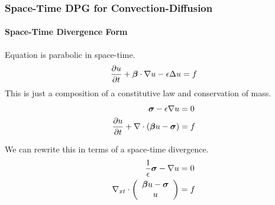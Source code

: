 \documentclass[18pt,xcolor=table]{beamer}
\begin{document}
\begin{frame}[t]
\frametitle{Space-Time DPG for Convection-Diffusion}
\framesubtitle{Space-Time Divergence Form}
Equation is parabolic in space-time.
\[
\frac{\partial u}{\partial t}+\boldsymbol\beta\cdot\nabla u-\epsilon\Delta u=f
\]
This is just a composition of a constitutive law and conservation of mass.
\begin{align*}
\boldsymbol\sigma-\epsilon\nabla u&=0\\
\frac{\partial u}{\partial t}+\nabla\cdot\left( \boldsymbol\beta u-\boldsymbol\sigma \right)&=f
\end{align*}

We can rewrite this in terms of a space-time divergence.
\begin{align*}
\frac{1}{\epsilon}\boldsymbol\sigma-\nabla u &=0\\
\nabla_{xt}\cdot\left( \begin{array}{c} \boldsymbol\beta u-\boldsymbol\sigma\\ u\\ \end{array} \right)&=f
\end{align*}
\end{frame}
\end{document}
